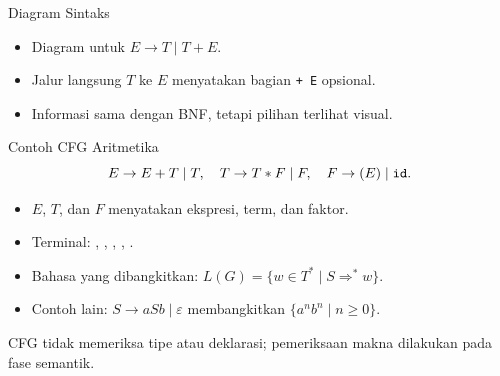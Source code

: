 \documentclass[aspectratio=169,10pt,t]{beamer}
\begin{document}
\begin{frame}{Diagram Sintaks}
  \begin{center}
  \end{center}

  \begin{itemize}
    \item Diagram untuk \(E \to T \mid T + E\).
    \item Jalur langsung \(T\) ke \(E\) menyatakan bagian \texttt{+ E}
          opsional.
    \item Informasi sama dengan BNF, tetapi pilihan terlihat visual.
  \end{itemize}
\end{frame}

\begin{frame}{Contoh CFG Aritmetika}
  \[
    E \to E + T \mid T, \quad
    T \to T * F \mid F, \quad
    F \to (E) \mid \texttt{id}.
  \]

  \vspace{4pt}
  \begin{itemize}
    \item \(E\), \(T\), dan \(F\) menyatakan ekspresi, term, dan faktor.
    \item Terminal: , \code{+}, \code{*}, \code{(}, \code{)}.
    \item Bahasa yang dibangkitkan:
          \(L(G)=\{w \in T^{*} \mid S \Rightarrow^{*} w\}\).
    \item Contoh lain: \(S \to aSb \mid \varepsilon\) membangkitkan
          \(\{a^n b^n \mid n \ge 0\}\).
  \end{itemize}

  \vspace{4pt}
  {\footnotesize\color{ubbblue!80}CFG tidak memeriksa tipe atau
  deklarasi; pemeriksaan makna dilakukan pada fase semantik.}
\end{frame}
\end{document}
